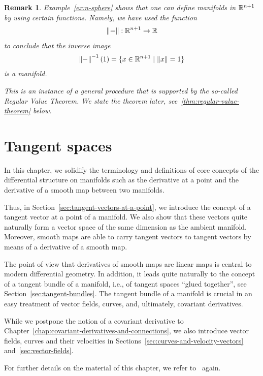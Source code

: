 \documentclass[11pt,a4paper,twoside,openany]{report}
\theoremstyle{my-theorem}
\theoremstyle{non-theorem}
\newtheorem{remark}[theorem]{Remark}
\begin{document}
		\begin{remark}
			Example~\ref{ex:n-sphere} shows that one can define manifolds in ${\mathbb R}^{n+1}$ by using certain functions. Namely, we have used the function
			\begin{align*}
				\left\lVert-\right\rVert: {\mathbb R}^{n+1} \to {\mathbb R}
			\end{align*}
			to conclude that the inverse image
			\begin{align*}
				\left\lVert-\right\rVert^{-1}(1) = \{ x \in {\mathbb R}^{n+1} \mid \left\lVert x\right\rVert = 1 \}
			\end{align*}
			is a manifold.
			
			This is an instance of a general procedure that is supported by the so-called \emph{Regular Value Theorem}. We state the theorem later, see~\ref{thm:regular-value-theorem} below.
		\end{remark}
	
	
	\chapter{Tangent spaces}
	\label{chap:tangent-spaces}
	In this chapter, we solidify the terminology and definitions of core concepts of the differential structure on manifolds such as the derivative at a point and the derivative of a smooth map between two manifolds.
	
	Thus, in Section~\ref{sec:tangent-vectors-at-a-point}, we introduce the concept of a tangent vector at a point of a manifold. We also show that these vectors quite naturally form a vector space of the same dimension as the ambient manifold. Moreover, smooth maps are able to carry tangent vectors to tangent vectors by means of a derivative of a smooth map.
	
	The point of view that derivatives of smooth maps are linear maps is central to modern differential geometry. In addition, it leads quite naturally to the concept of a tangent bundle of a manifold, i.e., of tangent spaces ``glued together'', see Section~\ref{sec:tangent-bundles}. The tangent bundle of a manifold is crucial in an easy treatment of vector fields, curves, and, ultimately, covariant derivatives.
	
	While we postpone the notion of a covariant derivative to Chapter~\ref{chap:covariant-derivatives-and-connections}, we also introduce vector fields, curves and their velocities in Sections~\ref{sec:curves-and-velocity-vectors} and~\ref{sec:vector-fields}.
	
	For further details on the material of this chapter, we refer to~\cite{lee:manifolds-and-differential-geometry} again.
	
\end{document}
